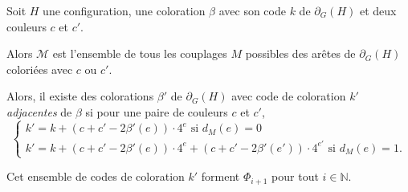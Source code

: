 \documentclass{beamer}
\begin{document}
\begin{frame}

Soit $H$ une configuration, une coloration $\beta$ avec son code $k$ de $\partial_G(H)$ et deux couleurs $c$ et $c'$. 

Alors $\mathcal{M}$ est l'ensemble de tous les couplages $M$ possibles des arêtes de $\partial_G(H)$ coloriées avec $c$ ou $c'$.

\pause

Alors, il existe des colorations $\beta'$ de $\partial_G(H)$ avec code de coloration $k'$ \emph{adjacentes} de $\beta$ si pour une paire de couleurs $c$ et $c'$,
$$
\begin{cases}
k' = k + (c + c'-2\beta'(e))\cdot 4^{e} \textrm{ si  }d_M(e)=0 \\
k' = k  + (c + c'-2\beta'(e))\cdot 4^{e} + (c + c'-2\beta'(e'))\cdot 4^{e'} \textrm{ si }d_M(e)=1.
\end{cases}
$$

Cet ensemble de codes de coloration $k'$ forment $\Phi_{i+1}$ pour tout $i\in \mathbb{N}$.
\end{frame}


%
%
%
%
%
%
%
%
%
%
%
%
%
%
%
\end{document}
